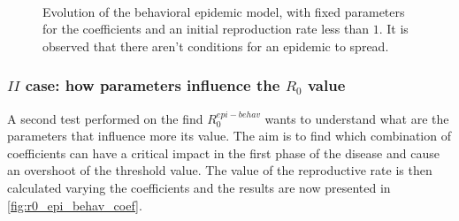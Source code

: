 \begin{figure}[ht]
	\centering
	 \quad
	 \\
	\caption[Epidemic behavioral model $R_0$]{Evolution of the behavioral epidemic model, with fixed parameters for the coefficients and an initial reproduction rate less than $1$. It is observed that there aren't conditions for an epidemic to spread.}
	\label{fig:infected00_epi_behav}
\end{figure}

\subsubsection{$II$ case: how parameters influence the $R_0$ value}

A second test performed on the find $R_0^{epi-behav}$ wants to understand what are the parameters that influence more its value. The aim is to find which combination of coefficients can have a critical impact in the first phase of the disease and cause an overshoot of the threshold value. The value of the reproductive rate is then calculated varying the coefficients and the results are now presented in \ref{fig:r0_epi_behav_coef}. 

